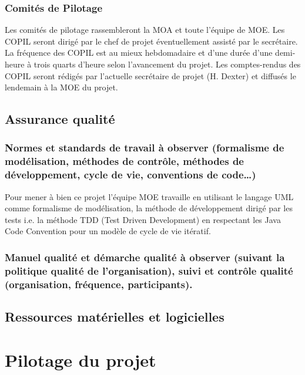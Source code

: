 \documentclass[12pt,a4paper,titlepage,openany]{report}
\begin{document}
    \subsection{Comités de Pilotage}
    Les comités de pilotage rassembleront la MOA et toute l’équipe de MOE. Les
    COPIL seront dirigé par le chef de projet éventuellement assisté par le
    secrétaire.
    \\La fréquence des COPIL est au mieux hebdomadaire et d’une durée d’une
    demi-heure à trois quarts d’heure selon l’avancement du projet.
    Les comptes-rendus des COPIL seront rédigés par l’actuelle secrétaire de
    projet (H. Dexter) et diffusés le lendemain à la MOE du projet.


    \section{Assurance qualité}
    \subsection{Normes et standards de travail à observer (formalisme de modélisation, méthodes de contrôle, méthodes de développement, cycle de vie, conventions de code…)}
    Pour mener à bien ce projet l'équipe MOE travaille
    en utilisant le langage UML comme formalisme de modélisation, la méthode de
    développement dirigé par les tests i.e. la méthode TDD (Test Driven
    Development) en respectant les Java Code Convention pour un modèle de cycle
    de vie itératif.

    \subsection{Manuel qualité et démarche qualité à observer (suivant la politique qualité de l’organisation), suivi et contrôle qualité (organisation, fréquence, participants).}


    \section{Ressources matérielles et logicielles}


    \chapter{Pilotage du projet}
\end{document}
